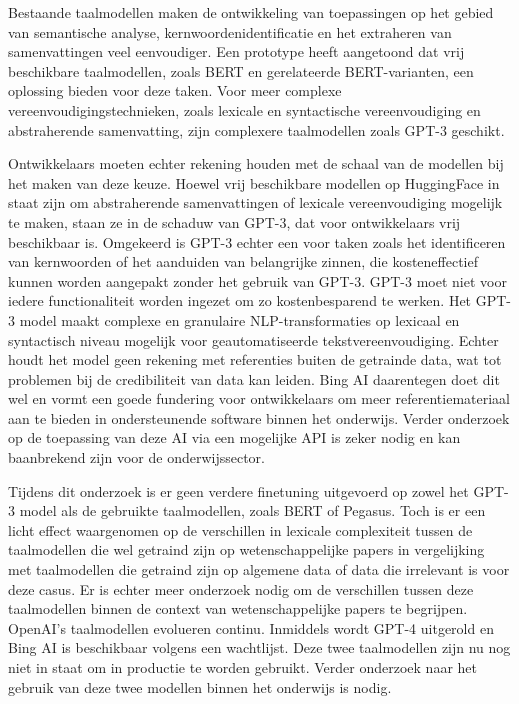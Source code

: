 Bestaande taalmodellen maken de ontwikkeling van toepassingen op het gebied van semantische analyse, kernwoordenidentificatie en het extraheren van samenvattingen veel eenvoudiger. Een prototype heeft aangetoond dat vrij beschikbare taalmodellen, zoals BERT en gerelateerde BERT-varianten, een oplossing bieden voor deze taken. Voor meer complexe vereenvoudigingstechnieken, zoals lexicale en syntactische vereenvoudiging en abstraherende samenvatting, zijn complexere taalmodellen zoals GPT-3 geschikt. 

Ontwikkelaars moeten echter rekening houden met de schaal van de modellen bij het maken van deze keuze. Hoewel vrij beschikbare modellen op HuggingFace in staat zijn om abstraherende samenvattingen of lexicale vereenvoudiging mogelijk te maken, staan ze in de schaduw van GPT-3, dat voor ontwikkelaars vrij beschikbaar is. Omgekeerd is GPT-3 echter een \textcite{overkill} voor taken zoals het identificeren van kernwoorden of het aanduiden van belangrijke zinnen, die kosteneffectief kunnen worden aangepakt zonder het gebruik van GPT-3. GPT-3 moet niet voor iedere functionaliteit worden ingezet om zo kostenbesparend te werken. Het GPT-3 model maakt complexe en granulaire NLP-transformaties op lexicaal en syntactisch niveau mogelijk voor geautomatiseerde tekstvereenvoudiging. Echter houdt het model geen rekening met referenties buiten de getrainde data, wat tot problemen bij de credibiliteit van data kan leiden. Bing AI daarentegen doet dit wel en vormt een goede fundering voor ontwikkelaars om meer referentiemateriaal aan te bieden in ondersteunende software binnen het onderwijs. Verder onderzoek op de toepassing van deze AI via een mogelijke API is zeker nodig en kan baanbrekend zijn voor de onderwijssector.

Tijdens dit onderzoek is er geen verdere finetuning uitgevoerd op zowel het GPT-3 model als de gebruikte taalmodellen, zoals BERT of Pegasus. Toch is er een licht effect waargenomen op de verschillen in lexicale complexiteit tussen de taalmodellen die wel getraind zijn op wetenschappelijke papers in vergelijking met taalmodellen die getraind zijn op algemene data of data die irrelevant is voor deze casus. Er is echter meer onderzoek nodig om de verschillen tussen deze taalmodellen binnen de context van wetenschappelijke papers te begrijpen. OpenAI's taalmodellen evolueren continu. Inmiddels wordt GPT-4 uitgerold en Bing AI is beschikbaar volgens een wachtlijst. Deze twee taalmodellen zijn nu nog niet in staat om in productie te worden gebruikt. Verder onderzoek naar het gebruik van deze twee modellen binnen het onderwijs is nodig.


